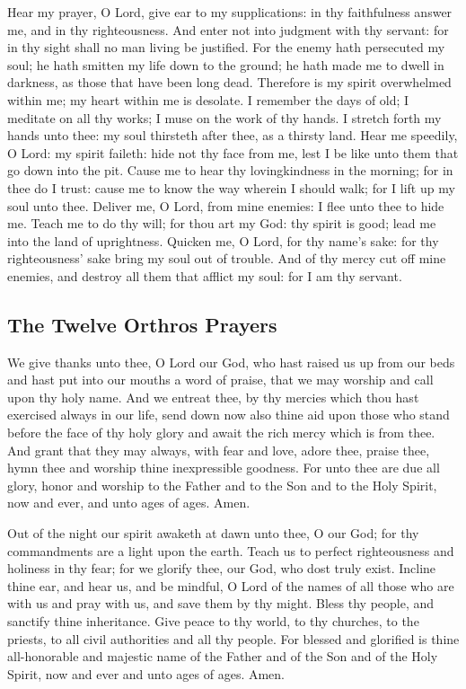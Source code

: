Hear my prayer, O Lord, give ear to my supplications: in thy faithfulness answer me, and in thy righteousness. And enter not into judgment with thy servant: for in thy sight shall no man living be justified. For the enemy hath persecuted my soul; he hath smitten my life down to the ground; he hath made me to dwell in darkness, as those that have been long dead. Therefore is my spirit overwhelmed within me; my heart within me is desolate. I remember the days of old; I meditate on all thy works; I muse on the work of thy hands. I stretch forth my hands unto thee: my soul thirsteth after thee, as a thirsty land. Hear me speedily, O Lord: my spirit faileth: hide not thy face from me, lest I be like unto them that go down into the pit. Cause me to hear thy lovingkindness in the morning; for in thee do I trust: cause me to know the way wherein I should walk; for I lift up my soul unto thee. Deliver me, O Lord, from mine enemies: I flee unto thee to hide me. Teach me to do thy will; for thou art my God: thy spirit is good; lead me into the land of uprightness. Quicken me, O Lord, for thy name's sake: for thy righteousness' sake bring my soul out of trouble. And of thy mercy cut off mine enemies, and destroy all them that afflict my soul: for I am thy servant.

\subsection{The Twelve Orthros Prayers}

 We give thanks unto thee, O Lord our God, who hast raised us up from our beds and hast put into our mouths a word of praise, that we may worship and call upon thy holy name. And we entreat thee, by thy mercies which thou hast exercised always in our life, send down now also thine aid upon those who stand before the face of thy holy glory and await the rich mercy which is from thee. And grant that they may always, with fear and love, adore thee, praise thee, hymn thee and worship thine inexpressible goodness. For unto thee are due all glory, honor and worship to the Father and to the Son and to the Holy Spirit, now and ever, and unto ages of ages. Amen.

 Out of the night our spirit awaketh at dawn unto thee, O our God; for thy commandments are a light upon the earth. Teach us to perfect righteousness and holiness in thy fear; for we glorify thee, our God, who dost truly exist. Incline thine ear, and hear us, and be mindful, O Lord of the names of all those who are with us and pray with us, and save them by thy might. Bless thy people, and sanctify thine inheritance. Give peace to thy world, to thy churches, to the priests, to all civil authorities and all thy people. For blessed and glorified is thine all-honorable and majestic name of the Father and of the Son and of the Holy Spirit, now and ever and unto ages of ages. Amen.


